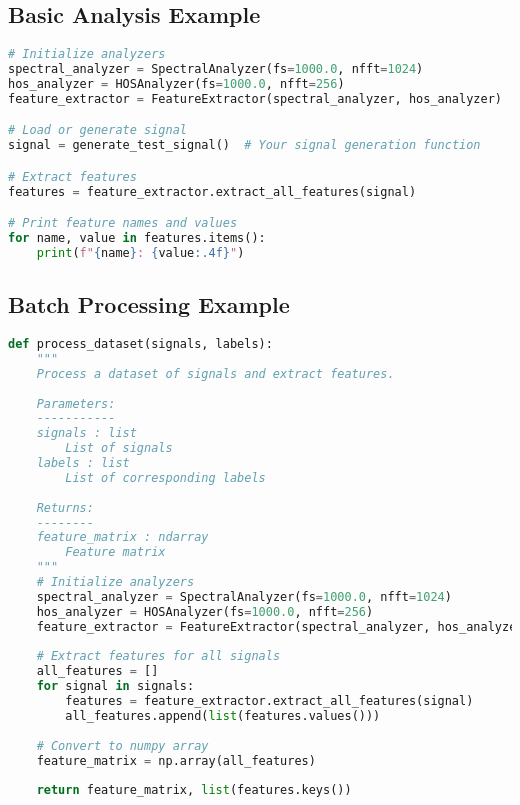 \subsection{Basic Analysis Example}

\begin{lstlisting}[language=Python, caption=Basic usage example]
# Initialize analyzers
spectral_analyzer = SpectralAnalyzer(fs=1000.0, nfft=1024)
hos_analyzer = HOSAnalyzer(fs=1000.0, nfft=256)
feature_extractor = FeatureExtractor(spectral_analyzer, hos_analyzer)

# Load or generate signal
signal = generate_test_signal()  # Your signal generation function

# Extract features
features = feature_extractor.extract_all_features(signal)

# Print feature names and values
for name, value in features.items():
    print(f"{name}: {value:.4f}")
\end{lstlisting}

\subsection{Batch Processing Example}

\begin{lstlisting}[language=Python, caption=Batch processing example]
def process_dataset(signals, labels):
    """
    Process a dataset of signals and extract features.
    
    Parameters:
    -----------
    signals : list
        List of signals
    labels : list
        List of corresponding labels
        
    Returns:
    --------
    feature_matrix : ndarray
        Feature matrix
    """
    # Initialize analyzers
    spectral_analyzer = SpectralAnalyzer(fs=1000.0, nfft=1024)
    hos_analyzer = HOSAnalyzer(fs=1000.0, nfft=256)
    feature_extractor = FeatureExtractor(spectral_analyzer, hos_analyzer)
    
    # Extract features for all signals
    all_features = []
    for signal in signals:
        features = feature_extractor.extract_all_features(signal)
        all_features.append(list(features.values()))
    
    # Convert to numpy array
    feature_matrix = np.array(all_features)
    
    return feature_matrix, list(features.keys())
\end{lstlisting}
